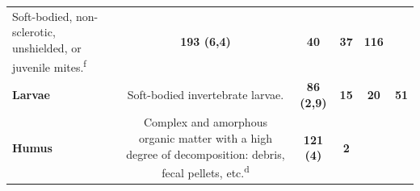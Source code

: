 \documentclass[10pt,oneside]{article}
\begin{document}
\begin{longtable}[]{@{}lccccc@{}}
\begin{minipage}[t]{0.45\columnwidth}
Soft-bodied, non-sclerotic, unshielded, or juvenile
mites.\textsuperscript{f}\strut
\end{minipage} & \begin{minipage}[t]{0.14\columnwidth}\centering
\textbf{193 (6,4)}\strut
\end{minipage} & \begin{minipage}[t]{0.04\columnwidth}\centering
\textbf{40}\strut
\end{minipage} & \begin{minipage}[t]{0.04\columnwidth}\centering
\textbf{37}\strut
\end{minipage} & \begin{minipage}[t]{0.04\columnwidth}\centering
\textbf{116}\strut
\end{minipage}\tabularnewline
\begin{minipage}[t]{0.11\columnwidth}\raggedright
\textbf{Larvae}\strut
\end{minipage} & \begin{minipage}[t]{0.45\columnwidth}\centering
Soft-bodied invertebrate larvae.\strut
\end{minipage} & \begin{minipage}[t]{0.14\columnwidth}\centering
\textbf{86 (2,9)}\strut
\end{minipage} & \begin{minipage}[t]{0.04\columnwidth}\centering
\textbf{15}\strut
\end{minipage} & \begin{minipage}[t]{0.04\columnwidth}\centering
\textbf{20}\strut
\end{minipage} & \begin{minipage}[t]{0.04\columnwidth}\centering
\textbf{51}\strut
\end{minipage}\tabularnewline
\begin{minipage}[t]{0.11\columnwidth}\raggedright
\textbf{Humus}\strut
\end{minipage} & \begin{minipage}[t]{0.45\columnwidth}\centering
Complex and amorphous organic matter with a high degree of
decomposition: debris, fecal pellets, etc.\textsuperscript{d}\strut
\end{minipage} & \begin{minipage}[t]{0.14\columnwidth}\centering
\textbf{121 (4)}\strut
\end{minipage} & \begin{minipage}[t]{0.04\columnwidth}\centering
\textbf{2}\strut
\end{minipage} & \begin{minipage}[t]{0.04\columnwidth}\centering

\end{minipage}
\end{longtable}
\end{document}
